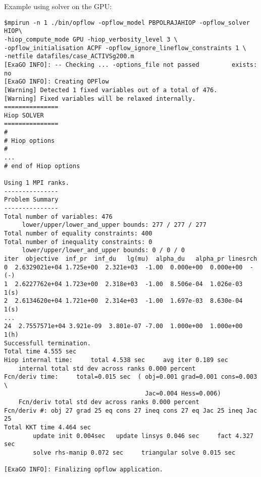 Example using \hiop solver on the GPU:

\begin{lstlisting}
$mpirun -n 1 ./bin/opflow -opflow_model PBPOLRAJAHIOP -opflow_solver HIOP\
-hiop_compute_mode GPU -hiop_verbosity_level 3 \
-opflow_initialisation ACPF -opflow_ignore_lineflow_constraints 1 \
-netfile datafiles/case_ACTIVSg200.m
[ExaGO INFO]: -- Checking ... -options_file not passed         exists: no
[ExaGO INFO]: Creating OPFlow
[Warning] Detected 1 fixed variables out of a total of 476.
[Warning] Fixed variables will be relaxed internally.
===============
Hiop SOLVER
===============
#
# Hiop options
#
...
# end of Hiop options

Using 1 MPI ranks.
---------------
Problem Summary
---------------
Total number of variables: 476
     lower/upper/lower_and_upper bounds: 277 / 277 / 277
Total number of equality constraints: 400
Total number of inequality constraints: 0
     lower/upper/lower_and_upper bounds: 0 / 0 / 0
iter  objective  inf_pr  inf_du   lg(mu)  alpha_du   alpha_pr linesrch
0  2.6329021e+04 1.725e+00  2.321e+03  -1.00  0.000e+00  0.000e+00  -(-)
1  2.6227762e+04 1.723e+00  2.318e+03  -1.00  8.506e-04  1.026e-03  1(s)
2  2.6134620e+04 1.721e+00  2.314e+03  -1.00  1.697e-03  8.630e-04  1(s)
...
24  2.7557571e+04 3.921e-09  3.801e-07 -7.00  1.000e+00  1.000e+00  1(h)
Successfull termination.
Total time 4.555 sec
Hiop internal time:     total 4.538 sec     avg iter 0.189 sec
    internal total std dev across ranks 0.000 percent
Fcn/deriv time:     total=0.015 sec  ( obj=0.001 grad=0.001 cons=0.003 \
                                       Jac=0.004 Hess=0.006)
    Fcn/deriv total std dev across ranks 0.000 percent
Fcn/deriv #: obj 27 grad 25 eq cons 27 ineq cons 27 eq Jac 25 ineq Jac 25
Total KKT time 4.464 sec
        update init 0.004sec   update linsys 0.046 sec     fact 4.327 sec
        solve rhs-manip 0.072 sec     triangular solve 0.015 sec

[ExaGO INFO]: Finalizing opflow application.
\end{lstlisting}

